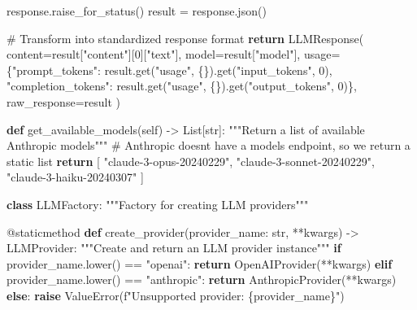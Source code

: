 \documentclass[
  11pt,
  letterpaper,
]{book}
\newenvironment{Shaded}{\begin{snugshade}}{\end{snugshade}}
\newcommand{\AttributeTok}[1]{\textcolor[rgb]{0.40,0.45,0.13}{#1}}
\newcommand{\BuiltInTok}[1]{\textcolor[rgb]{0.00,0.23,0.31}{#1}}
\newcommand{\CommentTok}[1]{\textcolor[rgb]{0.37,0.37,0.37}{#1}}
\newcommand{\ControlFlowTok}[1]{\textcolor[rgb]{0.00,0.23,0.31}{\textbf{#1}}}
\newcommand{\DecValTok}[1]{\textcolor[rgb]{0.68,0.00,0.00}{#1}}
\newcommand{\KeywordTok}[1]{\textcolor[rgb]{0.00,0.23,0.31}{\textbf{#1}}}
\newcommand{\NormalTok}[1]{\textcolor[rgb]{0.00,0.23,0.31}{#1}}
\newcommand{\OperatorTok}[1]{\textcolor[rgb]{0.37,0.37,0.37}{#1}}
\newcommand{\PreprocessorTok}[1]{\textcolor[rgb]{0.68,0.00,0.00}{#1}}
\newcommand{\SpecialCharTok}[1]{\textcolor[rgb]{0.37,0.37,0.37}{#1}}
\newcommand{\SpecialStringTok}[1]{\textcolor[rgb]{0.13,0.47,0.30}{#1}}
\newcommand{\StringTok}[1]{\textcolor[rgb]{0.13,0.47,0.30}{#1}}
\newcommand{\VariableTok}[1]{\textcolor[rgb]{0.07,0.07,0.07}{#1}}
\begin{document}
\begin{Shaded}
\begin{Highlighting}[]
\NormalTok{        response.raise\_for\_status()}
\NormalTok{        result }\OperatorTok{=}\NormalTok{ response.json()}

        \CommentTok{\# Transform into standardized response format}
        \ControlFlowTok{return}\NormalTok{ LLMResponse(}
\NormalTok{            content}\OperatorTok{=}\NormalTok{result[}\StringTok{"content"}\NormalTok{][}\DecValTok{0}\NormalTok{][}\StringTok{"text"}\NormalTok{],}
\NormalTok{            model}\OperatorTok{=}\NormalTok{result[}\StringTok{"model"}\NormalTok{],}
\NormalTok{            usage}\OperatorTok{=}\NormalTok{\{}\StringTok{"prompt\_tokens"}\NormalTok{: result.get(}\StringTok{"usage"}\NormalTok{, \{\}).get(}\StringTok{"input\_tokens"}\NormalTok{, }\DecValTok{0}\NormalTok{),}
                   \StringTok{"completion\_tokens"}\NormalTok{: result.get(}\StringTok{"usage"}\NormalTok{, \{\}).get(}\StringTok{"output\_tokens"}\NormalTok{, }\DecValTok{0}\NormalTok{)\},}
\NormalTok{            raw\_response}\OperatorTok{=}\NormalTok{result}
\NormalTok{        )}

    \KeywordTok{def}\NormalTok{ get\_available\_models(}\VariableTok{self}\NormalTok{) }\OperatorTok{{-}\textgreater{}}\NormalTok{ List[}\BuiltInTok{str}\NormalTok{]:}
        \CommentTok{"""Return a list of available Anthropic models"""}
        \CommentTok{\# Anthropic doesn\textquotesingle{}t have a models endpoint, so we return a static list}
        \ControlFlowTok{return}\NormalTok{ [}
            \StringTok{"claude{-}3{-}opus{-}20240229"}\NormalTok{,}
            \StringTok{"claude{-}3{-}sonnet{-}20240229"}\NormalTok{,}
            \StringTok{"claude{-}3{-}haiku{-}20240307"}
\NormalTok{        ]}

\KeywordTok{class}\NormalTok{ LLMFactory:}
    \CommentTok{"""Factory for creating LLM providers"""}

    \AttributeTok{@staticmethod}
    \KeywordTok{def}\NormalTok{ create\_provider(provider\_name: }\BuiltInTok{str}\NormalTok{, }\OperatorTok{**}\NormalTok{kwargs) }\OperatorTok{{-}\textgreater{}}\NormalTok{ LLMProvider:}
        \CommentTok{"""Create and return an LLM provider instance"""}
        \ControlFlowTok{if}\NormalTok{ provider\_name.lower() }\OperatorTok{==} \StringTok{"openai"}\NormalTok{:}
            \ControlFlowTok{return}\NormalTok{ OpenAIProvider(}\OperatorTok{**}\NormalTok{kwargs)}
        \ControlFlowTok{elif}\NormalTok{ provider\_name.lower() }\OperatorTok{==} \StringTok{"anthropic"}\NormalTok{:}
            \ControlFlowTok{return}\NormalTok{ AnthropicProvider(}\OperatorTok{**}\NormalTok{kwargs)}
        \ControlFlowTok{else}\NormalTok{:}
            \ControlFlowTok{raise} \PreprocessorTok{ValueError}\NormalTok{(}\SpecialStringTok{f"Unsupported provider: }\SpecialCharTok{\{}\NormalTok{provider\_name}\SpecialCharTok{\}}\SpecialStringTok{"}\NormalTok{)}
\end{Highlighting}
\end{Shaded}
\end{document}
